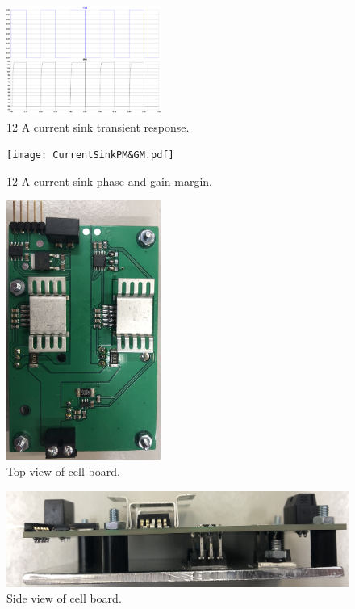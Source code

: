 \begin{figure}[h!]
    \centering
    \includegraphics[width=0.45\textwidth]{CurrentSinkTransient.pdf}
    \caption{12 A current sink transient response.}
    \label{fig:CurrentSinkTransient}
\end{figure}

\begin{figure}[h!]
    \centering
    \texttt{[image: CurrentSinkPM\&GM.pdf]}
    \caption{12 A current sink phase and gain margin.}
    \label{fig:CurrentSinkPM&GM}
\end{figure}

\begin{figure}[h!]
    \centering
    \includegraphics[width=0.45\textwidth]{CellBoardTop.jpg}
    \caption{Top view of cell board.}
    \label{fig:CellBoardTop}
\end{figure}

\begin{figure}[h!]
    \centering
    \includegraphics[height=0.45\textwidth,angle=90,origin=c]{CellBoardSide.jpg}
    \caption{Side view of cell board.}
    \label{fig:CellBoardSide}
\end{figure}

